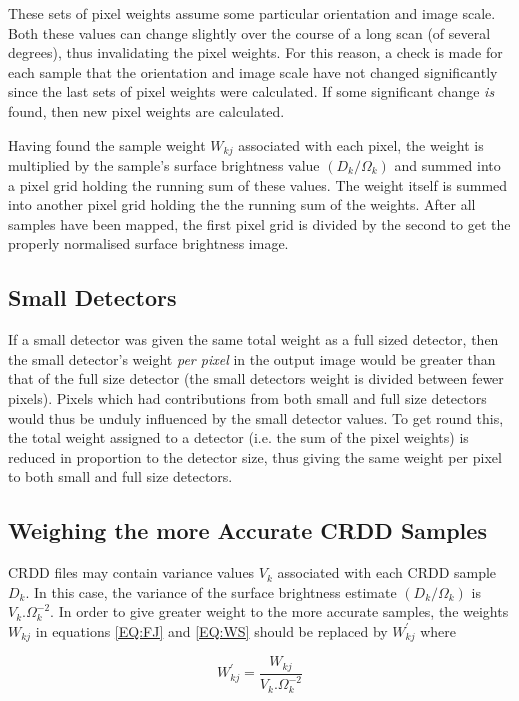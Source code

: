 These sets of pixel weights assume some particular orientation and image scale.
Both these values can change slightly over the course of a long scan (of
several degrees), thus invalidating the pixel weights. For this reason, a check
is made for each sample that the orientation and image scale have not changed
significantly since the last sets of pixel weights were calculated. If some
significant change {\em is} found, then new pixel weights are calculated.

Having found the sample weight $W_{kj}$ associated with each pixel, the weight
is multiplied by the sample's surface brightness value $(D_{k}/\Omega_{k})$ and
summed into a pixel grid holding the running sum of these values. The weight
itself is summed into another pixel grid holding the the running sum of the
weights. After all samples have been mapped, the first pixel grid is divided by
the second to get the properly normalised surface brightness image.

\subsection{Small Detectors}
If a small detector was given the same total weight as a full sized detector,
then the small detector's weight {\em per pixel} in the output image would be
greater than that of the full size detector (the small detectors weight is
divided between fewer pixels). Pixels which had contributions from both small
and full size detectors would thus be unduly influenced by the small detector
values. To get round this, the total weight assigned to a detector (i.e. the sum
of the pixel weights) is reduced in proportion to the detector size, thus giving
the same weight per pixel to both small and full size detectors.

\subsection{Weighing the more Accurate CRDD Samples}
\label {SEC:ACC}
CRDD files may contain variance values $V_{k}$ associated with each CRDD sample
$D_{k}$. In this case, the variance of the surface brightness estimate
$(D_{k}/\Omega_{k})$ is $V_{k}.\Omega_{k}^{-2}$. In order to give greater weight
to the more accurate samples, the weights $W_{kj}$ in equations \ref{EQ:FJ} and
\ref{EQ:WS} should be replaced by $W^{\prime}_{kj}$  where

\begin{equation}
W^{\prime}_{kj}=\frac{W_{kj}}{V_{k}.\Omega_{k}^{-2}}
\label {EQ:WKJ}
\end{equation}

